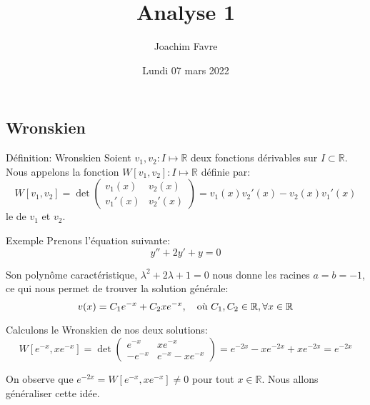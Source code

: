 \documentclass[a4paper]{article}
\title{Analyse 1}
\author{Joachim Favre}
\date{Lundi 07 mars 2022}
\begin{document}
\maketitle


\subsection{Wronskien}
\begin{parag}{Définition: Wronskien}
    Soient $v_1, v_2 : I \mapsto \mathbb{R}$ deux fonctions dérivables sur $I \subset \mathbb{R}$. Nous appelons la fonction $W\left[v_1, v_2\right] : I \mapsto \mathbb{R}$ définie par:
    \[W\left[v_1, v_2\right] = \det\begin{pmatrix} v_1\left(x\right) & v_2\left(x\right) \\ v_1'\left(x\right) & v_2'\left(x\right) \end{pmatrix} = v_1\left(x\right) v_2'\left(x\right) - v_2\left(x\right) v_1'\left(x\right)\]
    le  de $v_1$ et $v_2$.
\end{parag}


\begin{parag}{Exemple}
    Prenons l'équation suivante:
    \[y'' + 2y' + y = 0\]

    Son polynôme caractéristique, $\lambda^2 + 2\lambda + 1 = 0$ nous donne les racines $a = b = -1$, ce qui nous permet de trouver la solution générale:
    \[v\left(x\right) = C_1e^{-x} + C_2 xe^{-x}, \mathspace \text{où } C_1, C_2 \in\mathbb{R}, \forall x \in \mathbb{R}\]

    Calculons le Wronskien de nos deux solutions:
    \[W\left[e^{-x}, xe^{-x}\right] = \det\begin{pmatrix} e^{-x} & xe^{-x} \\ -e^{-x} & e^{-x} - xe^{-x} \end{pmatrix} = e^{-2x} -xe^{-2x} + xe^{-2x} = e^{-2x}\]

    On observe que $e^{-2x} = W\left[e^{-x}, xe^{-x}\right] \neq 0$ pour tout $x \in\mathbb{R}$. Nous allons généraliser cette idée.
\end{parag}
\end{document}
